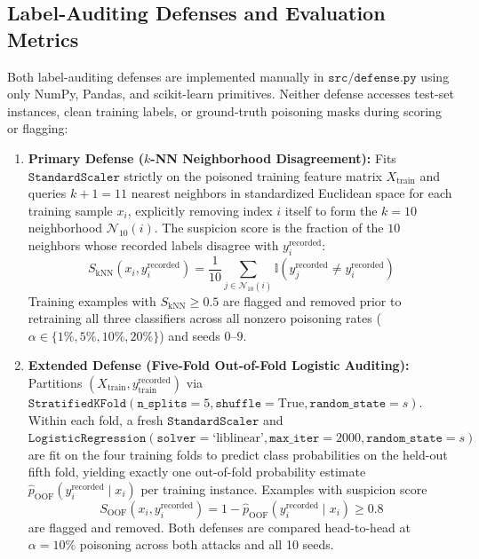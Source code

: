 \documentclass[10pt,conference]{IEEEtran}
\begin{document}
\subsection{Label-Auditing Defenses and Evaluation Metrics}
Both label-auditing defenses are implemented manually in $\mathtt{src/defense.py}$ using only NumPy, Pandas, and scikit-learn primitives. Neither defense accesses test-set instances, clean training labels, or ground-truth poisoning masks during scoring or flagging:
\begin{enumerate}
    \item \textbf{Primary Defense ($k$-NN Neighborhood Disagreement):} Fits $\mathtt{StandardScaler}$ strictly on the poisoned training feature matrix $X_{\text{train}}$ and queries $k+1=11$ nearest neighbors in standardized Euclidean space for each training sample $x_i$, explicitly removing index $i$ itself to form the $k=10$ neighborhood $\mathcal{N}_{10}(i)$. The suspicion score is the fraction of the $10$ neighbors whose recorded labels disagree with $y_i^{\text{recorded}}$:
    \begin{equation}
    S_{\text{kNN}}(x_i, y_i^{\text{recorded}}) = \frac{1}{10} \sum_{j \in \mathcal{N}_{10}(i)} \mathbb{I}\!\left(y_j^{\text{recorded}} \neq y_i^{\text{recorded}}\right)
    \end{equation}
    Training examples with $S_{\text{kNN}} \ge 0.5$ are flagged and removed prior to retraining all three classifiers across all nonzero poisoning rates ($\alpha \in \{1\%, 5\%, 10\%, 20\%\}$) and seeds $0$--$9$.
    \item \textbf{Extended Defense (Five-Fold Out-of-Fold Logistic Auditing):} Partitions $(X_{\text{train}}, y_{\text{train}}^{\text{recorded}})$ via $\mathtt{StratifiedKFold}(\mathtt{n\_splits}=5, \mathtt{shuffle}=\text{True}, \mathtt{random\_state}=s)$. Within each fold, a fresh $\mathtt{StandardScaler}$ and $\mathtt{LogisticRegression}(\mathtt{solver}=\text{`liblinear'}, \mathtt{max\_iter}=2000, \mathtt{random\_state}=s)$ are fit on the four training folds to predict class probabilities on the held-out fifth fold, yielding exactly one out-of-fold probability estimate $\hat{p}_{\text{OOF}}(y_i^{\text{recorded}} \mid x_i)$ per training instance. Examples with suspicion score
    \begin{equation}
    S_{\text{OOF}}(x_i, y_i^{\text{recorded}}) = 1 - \hat{p}_{\text{OOF}}\!\left(y_i^{\text{recorded}} \mid x_i\right) \ge 0.8
    \end{equation}
    are flagged and removed. Both defenses are compared head-to-head at $\alpha = 10\%$ poisoning across both attacks and all 10 seeds.
\end{enumerate}
\end{document}
